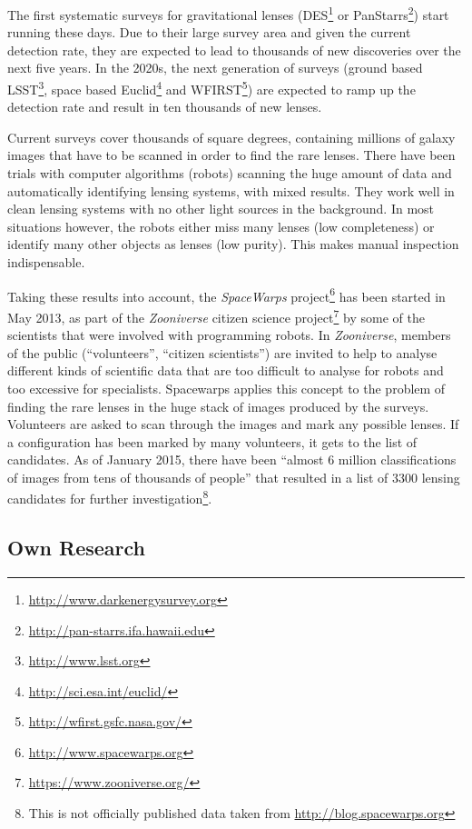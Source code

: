 \documentclass[11pt]{article}
\begin{document}
The first systematic surveys for gravitational lenses (DES\footnote{\url{http://www.darkenergysurvey.org}} or PanStarrs\footnote{\url{http://pan-starrs.ifa.hawaii.edu}}) start running these days.
Due to their large survey area and given the current detection rate, they are expected to lead to thousands of new discoveries over the next five years.
In the 2020s, the next generation of surveys (ground based LSST\footnote{\url{http://www.lsst.org}}, space based Euclid\footnote{\url{http://sci.esa.int/euclid/}} and WFIRST\footnote{\url{http://wfirst.gsfc.nasa.gov/}}) are expected to ramp up the detection rate and result in ten thousands of new lenses.

Current surveys cover thousands of square degrees, containing millions of galaxy images that have to be scanned in order to find the rare lenses.
There have been trials with computer algorithms (robots) scanning the huge amount of data and automatically identifying lensing systems\cite{robots}, with mixed results.
They work well in clean lensing systems with no other light sources in the background.
In most situations however, the robots either miss many lenses (low completeness) or identify many other objects as lenses (low purity).
This makes manual inspection indispensable.

Taking these results into account, the \emph{SpaceWarps} project\footnote{\url{http://www.spacewarps.org}} has been started in May 2013, as part of the \emph{Zooniverse} citizen science project\footnote{\url{https://www.zooniverse.org/}} by some of the scientists that were involved with programming robots.
In \emph{Zooniverse}, members of the public (``volunteers'', ``citizen scientists'') are invited to help to analyse different kinds of scientific data that are too difficult to analyse for robots and too excessive for specialists.
Spacewarps applies this concept to the problem of finding the rare lenses in the huge stack of images produced by the surveys.
Volunteers are asked to scan through the images and mark any possible lenses.
If a configuration has been marked by many volunteers, it gets to the list of candidates.
As of January 2015, there have been ``almost 6 million classifications of images from tens of thousands of people'' that resulted in a list of 3300 lensing candidates for further investigation\footnote{This is not officially published data taken from \url{http://blog.spacewarps.org}}.



\subsection{Own Research}
\end{document}
